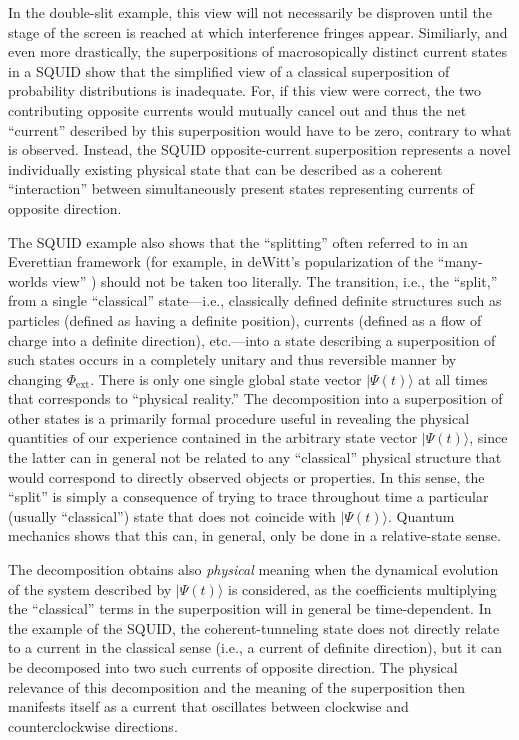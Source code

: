 \documentclass[12pt,aps,floatfix,amsmath,amssymb,showpacs,nofootinbib]{revtex4-2}
\newcommand{\ket}[1]{\ensuremath{|{#1\rangle}}}
\begin{document}
In the double-slit example, this view will not necessarily be
disproven until the stage of the screen is reached at which
interference fringes appear. Similiarly, and even more drastically,
the superpositions of macrosopically distinct current states in a
SQUID show that the simplified view of a classical superposition of
probability distributions is inadequate. For, if this view were
correct, the two contributing opposite currents would mutually cancel
out and thus the net ``current'' described by this superposition would
have to be zero, contrary to what is observed.  Instead, the SQUID
opposite-current superposition represents a novel individually
existing physical state that can be described as a coherent
``interaction'' between simultaneously present states representing
currents of opposite direction.

The SQUID example also shows that the ``splitting'' often referred to
in an Everettian framework (for example, in deWitt's popularization
of the ``many-worlds view''
\cite{DeWitt:1970:pl,DeWitt:1971:pz,DeWitt:1973:pz}) should not be
taken too literally.  The transition, i.e., the ``split,'' from a
single ``classical'' state---i.e., classically defined definite
structures such as particles (defined as having a definite position),
currents (defined as a flow of charge into a definite direction),
etc.---into a state describing a superposition of such states occurs
in a completely unitary and thus reversible manner by changing
$\Phi_\text{ext}$. There is only one single global state vector
$\ket{\Psi(t)}$ at all times that corresponds to ``physical reality.''
The decomposition into a superposition of other states is a primarily
formal procedure useful in revealing the physical quantities of
our experience contained in the arbitrary state vector
$\ket{\Psi(t)}$, since the latter can in general not be related to any
``classical'' physical structure that would correspond to directly
observed objects or properties. In this sense, the ``split'' is simply
a consequence of trying to trace throughout time a particular (usually
``classical'') state that does not coincide with $\ket{\Psi(t)}$.
Quantum mechanics shows that this can, in general, only be done in a
relative-state sense.

The decomposition obtains also {\em physical} meaning when the
dynamical evolution of the system described by $\ket{\Psi(t)}$ is
considered, as the coefficients multiplying the ``classical'' terms in
the superposition will in general be time-dependent. In the example of
the SQUID, the coherent-tunneling state does not directly relate to a
current in the classical sense (i.e., a current of definite
direction), but it can be decomposed into two such currents of
opposite direction. The physical relevance of this decomposition and
the meaning of the superposition then manifests itself as a current
that oscillates between clockwise and counterclockwise directions.
\end{document}
